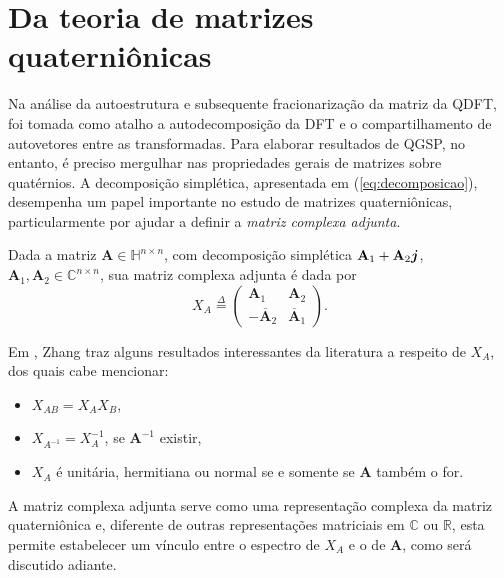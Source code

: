 
\section{Da teoria de matrizes quaterni\^onicas}

Na an\'alise da autoestrutura e subsequente fracionariza\c c\~ao da matriz da QDFT, foi tomada como atalho a autodecomposi\c c\~ao da DFT e o compartilhamento de autovetores entre as transformadas. Para elaborar resultados de QGSP, no entanto, \'e preciso mergulhar nas propriedades gerais de matrizes sobre quat\'ernios. A decomposi\c c\~ao simpl\'etica, apresentada em (\ref{eq:decomposicao}), desempenha um papel importante no estudo de matrizes quaterni\^onicas, particularmente por ajudar a definir a \emph{matriz complexa adjunta}.

\begin{definition}
Dada a matriz $ \mathbf{A} \in \mathbb{H}^{n \times n} $, com decomposi\c c\~ao simpl\'etica $ \mathbf{A}_1 + \mathbf{A}_2 \boldsymbol{j}$, $ \mathbf{A}_1,\mathbf{A}_2 \in \mathbb{C}^{n \times n} $, sua matriz complexa adjunta \'e dada por
\begin{equation}
X_{A} \overset{\Delta}{=}
\begin{pmatrix}
\mathbf{A}_1 & \mathbf{A}_2\\ 
- \overline{\mathbf{A}}_2 & \overline{\mathbf{A}}_1
\end{pmatrix}.
\end{equation}
\end{definition}

Em \cite[Teoremas 4.2 e 4.3]{zhang1997quaternions}, Zhang traz alguns resultados interessantes da literatura a respeito de $ X_A $, dos quais cabe mencionar:
\begin{itemize}[noitemsep]
\item $ X_{AB} = X_{A} X_{B} $,
\item $ X_{A^{-1}} = X_{A}^{-1}$, se $ \mathbf{A}^{-1} $ existir,
\item $ X_{A}$ \'e unit\'aria, hermitiana ou normal se e somente se $ \mathbf{A} $ tamb\'em o for.
\end{itemize}
A matriz complexa adjunta serve como uma representa\c c\~ao complexa da matriz quaterni\^onica e, diferente de outras representa\c c\~oes matriciais em $ \mathbb{C} $ ou $ \mathbb{R} $, esta permite estabelecer um v\'inculo entre o espectro de $ X_{A} $ e o de $ \mathbf{A} $, como ser\'a discutido adiante.

